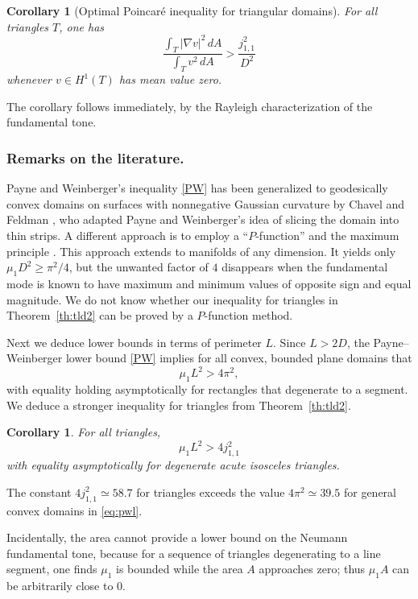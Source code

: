 \documentclass[11pt,reqno]{amsart}
\newtheorem{corollary}[theorem]{Corollary}
\numberwithin{equation}{section}
\begin{document}
\begin{corollary}[Optimal Poincar\'{e} inequality for triangular
domains] For all triangles $T$, one has
\[
\frac{\int_T |\nabla v|^2 \, dA}{\int_T v^2 \, dA} >
\frac{j_{1,1}^2}{D^2}
\]
whenever $v \in H^1(T)$ has mean value zero.
\end{corollary}
The corollary follows immediately, by the Rayleigh characterization of the fundamental tone.

\subsubsection*{Remarks on the literature.} Payne and Weinberger's inequality \eqref{PW} has been generalized to geodesically convex domains on surfaces with nonnegative Gaussian curvature by Chavel and Feldman \cite{CF77}, who adapted Payne and Weinberger's idea of slicing the domain into thin strips. A different approach is to employ a ``$P$-function'' and the maximum principle \cite[Theorem 8.13]{S81}. This approach extends to manifolds of any dimension. It yields only $\mu_1 D^2 \geq \pi^2/4$, but the unwanted factor of $4$ disappears when the fundamental mode is known to have maximum and minimum values of opposite sign and equal magnitude. We do not know whether our inequality for triangles in Theorem~\ref{th:tld2} can be proved by a $P$-function method. 

\medskip Next we deduce lower bounds in terms of perimeter $L$. Since $L>2D$, the Payne--Weinberger lower bound \eqref{PW} implies for all convex, bounded plane domains that
\begin{equation} \label{eq:pwl}
  \mu_1 L^2>4\pi^2 ,
\end{equation}
with equality holding asymptotically for rectangles that degenerate to a segment. We
deduce a stronger inequality for triangles from
Theorem~\ref{th:tld2}.
\begin{corollary} \label{co:tll}
For all triangles,
\[
    \mu_1 L^2>4j_{1,1}^2
\]
with equality asymptotically for degenerate acute isosceles
triangles.
\end{corollary}
The constant $4j_{1,1}^2 \simeq 58.7$ for triangles exceeds the
value $4\pi^2 \simeq 39.5$ for general convex domains in \eqref{eq:pwl}.

Incidentally, the area cannot provide a lower bound on the Neumann
fundamental tone, because for a sequence of triangles degenerating
to a line segment, one finds $\mu_1$ is bounded while the area $A$
approaches zero; thus $\mu_1 A$ can be arbitrarily close to $0$.
\end{document}
